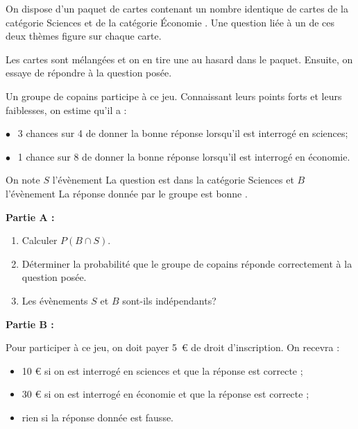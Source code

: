 \medskip

On dispose d'un paquet de cartes contenant un nombre identique de cartes de la catégorie \og Sciences\fg{} et de la catégorie \og Économie \fg. Une question liée à un de ces deux thèmes figure sur chaque carte.

Les cartes sont mélangées et on en tire une au hasard dans le paquet. Ensuite, on essaye de répondre à la question posée.

Un groupe de copains participe à ce jeu. Connaissant leurs points forts et leurs faiblesses, on estime qu'il a :

$\bullet~~$ 3 chances sur 4 de donner la bonne réponse lorsqu'il est interrogé en sciences;

$\bullet~~$ 1 chance sur 8 de donner la bonne réponse lorsqu'il est interrogé en économie.

\smallskip

On note $S$ l'évènement \og La question est dans la catégorie Sciences\fg{} et $B$ l'évènement \og La réponse donnée par le groupe est bonne \fg.

\bigskip

\textbf{Partie A :}

\medskip

\begin{enumerate}
\item Calculer $P(B \cap S)$.
\item Déterminer la probabilité que le groupe de copains réponde correctement à la
question posée.
\item Les évènements $S$ et $B$ sont-ils indépendants?
\end{enumerate}

\bigskip

\textbf{Partie B :}

\medskip

Pour participer à ce jeu, on doit payer 5~\euro{} de droit d'inscription. On recevra :

\setlength\parindent{1cm}
\begin{itemize}
\item[$\bullet$~~] 10 \euro{} si on est interrogé en sciences et que la réponse est correcte ;
\item[$\bullet$~~] 30 \euro{} si on est interrogé en économie et que la réponse est correcte ;
\item[$\bullet$~~] rien si la réponse donnée est fausse.
\end{itemize}
\setlength\parindent{0cm}

